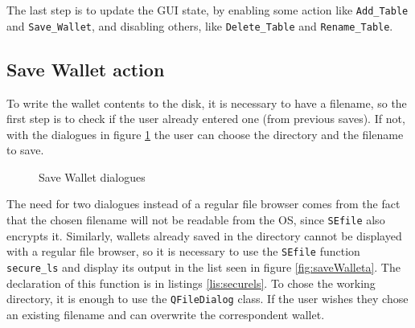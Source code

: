 The last step is to update the GUI state, by enabling some action like \texttt{Add\_Table} and \texttt{Save\_Wallet}, and disabling others, like \texttt{Delete\_Table} and \texttt{Rename\_Table}.

\subsection{Save Wallet action}
To write the wallet contents to the disk, it is necessary to have a filename, so the first step is to check if the user already entered one (from previous saves). If not, with the dialogues in figure \ref{fig:saveWallet} the user can choose the directory and the filename to save.

\begin{figure}[ht]
  \centering
  {}
  \caption{Save Wallet dialogues}
 \label{fig:saveWallet}
\end{figure}

The need for two dialogues instead of a regular file browser comes from the fact that the chosen filename will not be readable from the OS, since \texttt{SEfile} also encrypts it. Similarly, wallets already saved in the directory cannot be displayed with a regular file browser, so it is necessary to use the \texttt{SEfile} function \texttt{secure\_ls} and display its output in the list seen in figure \ref{fig:saveWalleta}. The declaration of this function is in listings \ref{lis:securels}. To chose the working directory, it is enough to use the \texttt{QFileDialog} class. If the user wishes they chose an existing filename and can overwrite the correspondent wallet.


